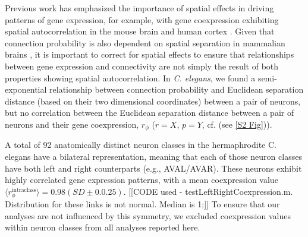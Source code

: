 \documentclass[10pt,letterpaper]{article}
\begin{document}
Previous work has emphasized the importance of spatial effects in driving patterns of gene expression, for example, with gene coexpression exhibiting spatial autocorrelation in the mouse brain \cite{Fulcher:2016ck} and human cortex \cite{Krienen:2016eq, Pantazatos:2016ir}.
Given that connection probability is also dependent on spatial separation in mammalian brains \cite{Henderson:2014fg, Horvat:2016ia}, it is important to correct for spatial effects to ensure that relationships between gene expression and connectivity are not simply the result of both properties showing spatial autocorrelation.
In \textit{C. elegans}, we found a semi-exponential relationship between connection probability and Euclidean separation distance (based on their two dimensional coordinates) between a pair of neurons, but no correlation between the Euclidean separation distance between a pair of neurons  and their gene coexpression,   $r_\phi$ ($r = X$, $p = Y$, cf. (see \ref{S2 Fig})).


A total of 92 anatomically distinct neuron classes in the hermaphrodite C. elegans have a bilateral representation, meaning that each of those neuron classes have both left and right counterparts (e.g., AVAL/AVAR).
These neurons exhibit highly correlated gene expression patterns, with a mean coexpression value $\langle r_\phi^{\mathrm{intraclass}} \rangle = 0.98 (SD\pm0.0.25)$.
[[CODE used - testLeftRightCoexpression.m. Distribution for these links is not normal. Median is 1;]]
To ensure that our analyses are not influenced by this symmetry, we excluded coexpression values within neuron classes from all analyses reported here.

\end{document}
